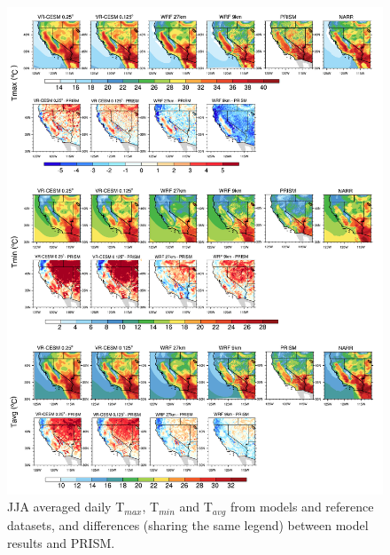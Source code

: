 \begin{figure}
\begin{center}
\includegraphics[width=6in]{t2_JJA.pdf}
\end{center}
\caption{JJA averaged daily T$_{max}$, T$_{min}$ and T$_{avg}$ from models and reference datasets, and differences (sharing the same legend) between model results and PRISM.} \label{fig:Figure 4}
\end{figure}

